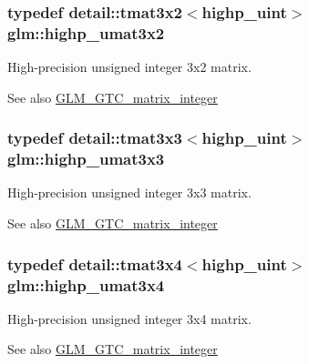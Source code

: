 \subsubsection[{highp\+\_\+umat3x2}]{\setlength{\rightskip}{0pt plus 5cm}typedef detail\+::tmat3x2$<$highp\+\_\+uint$>$ {\bf glm\+::highp\+\_\+umat3x2}}\label{group__gtc__matrix__integer_gae054a2e2dcecb6d435acc15a25d53ba5}
High-\/precision unsigned integer 3x2 matrix. \begin{DoxySeeAlso}{See also}
\hyperlink{group__gtc__matrix__integer}{G\+L\+M\+\_\+\+G\+T\+C\+\_\+matrix\+\_\+integer} 
\end{DoxySeeAlso}
\hypertarget{group__gtc__matrix__integer_ga0860bb2a1d49e039eac312c6ad4a1c65}{}
\subsubsection[{highp\+\_\+umat3x3}]{\setlength{\rightskip}{0pt plus 5cm}typedef detail\+::tmat3x3$<$highp\+\_\+uint$>$ {\bf glm\+::highp\+\_\+umat3x3}}\label{group__gtc__matrix__integer_ga0860bb2a1d49e039eac312c6ad4a1c65}
High-\/precision unsigned integer 3x3 matrix. \begin{DoxySeeAlso}{See also}
\hyperlink{group__gtc__matrix__integer}{G\+L\+M\+\_\+\+G\+T\+C\+\_\+matrix\+\_\+integer} 
\end{DoxySeeAlso}
\hypertarget{group__gtc__matrix__integer_ga6fd3ea8bf5ccfc7548bbf3e687a05022}{}
\subsubsection[{highp\+\_\+umat3x4}]{\setlength{\rightskip}{0pt plus 5cm}typedef detail\+::tmat3x4$<$highp\+\_\+uint$>$ {\bf glm\+::highp\+\_\+umat3x4}}\label{group__gtc__matrix__integer_ga6fd3ea8bf5ccfc7548bbf3e687a05022}
High-\/precision unsigned integer 3x4 matrix. \begin{DoxySeeAlso}{See also}
\hyperlink{group__gtc__matrix__integer}{G\+L\+M\+\_\+\+G\+T\+C\+\_\+matrix\+\_\+integer} 
\end{DoxySeeAlso}
\hypertarget{group__gtc__matrix__integer_gabf91e4747e9aad3d2b58c79da5d9b0d3}{}
